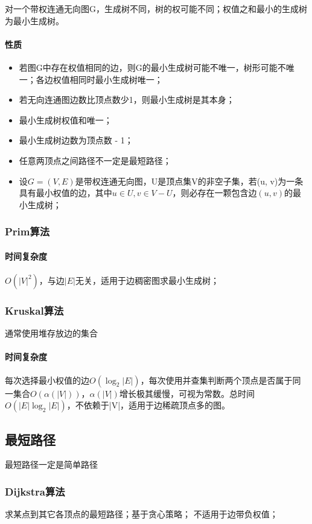 对一个带权连通无向图G，生成树不同，树的权可能不同；权值之和最小的生成树为最小生成树。

\paragraph{性质}
\begin{itemize}
    \item 若图G中存在权值相同的边，则G的最小生成树可能不唯一，树形可能不唯一；各边权值相同时最小生成树唯一；
    \item 若无向连通图边数比顶点数少1，则最小生成树是其本身；
    \item 最小生成树权值和唯一；
    \item 最小生成树边数为顶点数 - 1；
    \item 任意两顶点之间路径不一定是最短路径；
    \item 设\(G = (V, E)\)是带权连通无向图，U是顶点集V的非空子集，若(u, v)为一条具有最小权值的边，其中\(u \in U, v \in V - U\)，则必存在一颗包含边\((u, v)\)的最小生成树；
\end{itemize}

\subsubsection{Prim算法}

\paragraph{时间复杂度}
\(O(|V|^2)\)，与边\(|E|\)无关，适用于边稠密图求最小生成树；

\subsubsection{Kruskal算法}
通常使用堆存放边的集合

\paragraph{时间复杂度}
每次选择最小权值的边\(O(\log_2|E|)\)，每次使用并查集判断两个顶点是否属于同一集合\(O(\alpha(|V|))\)，\(\alpha(|V|)\)增长极其缓慢，可视为常数。总时间\(O(|E|\log_2|E|)\)，不依赖于|V|，适用于边稀疏顶点多的图。


\subsection{最短路径}
最短路径一定是简单路径

\subsubsection{Dijkstra算法}
求某点到其它各顶点的最短路径；基于贪心策略；
不适用于边带负权值；

